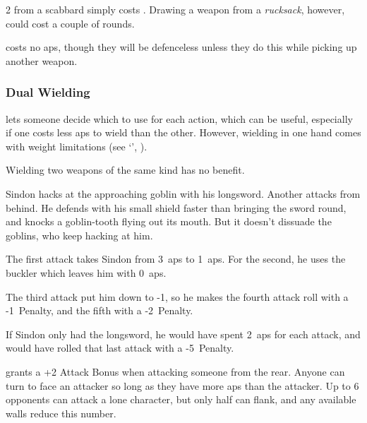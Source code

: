 \begin{multicols}{2}
from a scabbard simply costs .
Drawing a weapon from a \textit{rucksack}, however, could cost a couple of \glspl{round}.

costs no \glspl{ap}, though they will be defenceless unless they do this while picking up another weapon.

\subsubsection{Dual Wielding}
%
%
lets someone decide which to use for each \gls{action}, which can be useful, especially if one costs less \glspl{ap} to wield than the other.
However, wielding  in one hand comes with \gls{weight} limitations (see `', ).

Wielding two \glspl{weapon} of the same kind has no benefit.

\begin{exampletext}
  \noindent Sindon hacks at the approaching goblin with his longsword.
  Another attacks from behind.
  He defends with his small shield faster than bringing the sword round, and knocks a goblin-tooth flying out its mouth.
  But it doesn't dissuade the goblins, who keep hacking at him.

  {\sffamily
    The first attack takes Sindon from 3~\glspl{ap} to 1~\glspl{ap}.
    For the second, he uses the buckler which leaves him with 0~\glspl{ap}.

    The third attack put him down to -1, so he makes the fourth attack roll with a -1~Penalty, and the fifth with a -2~Penalty.

    If Sindon only had the longsword, he would have spent 2~\glspl{ap} for each attack, and would have rolled that last attack with a -5~Penalty.
  }
\end{exampletext}

\vspace{1\baselineskip}

\vspace{1\baselineskip}

grants a +2 Attack Bonus when attacking someone from the rear.
Anyone can turn to face an attacker so long as they have more \glspl{ap} than the attacker.
Up to 6 opponents can attack a lone character, but only half can flank, and any available walls reduce this number.


\end{multicols}
